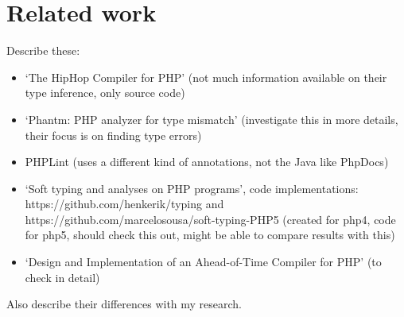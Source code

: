 \documentclass[../main.tex]{subfiles}
\begin{document}
    
    \section{Related work}\label{sec:background_related-work}
    Describe these:
    \begin{itemize}
        \item `The HipHop Compiler for PHP'\cite{Zhao:12} (not much information available on their type inference, only source code)
        \item `Phantm: PHP analyzer for type mismatch'\cite{Kne:10,Bar:10} (investigate this in more details, their focus is on finding type errors)
        \item PHPLint \footnotemark (uses a different kind of annotations, not the Java like PhpDocs)
        \item `Soft typing and analyses on PHP programs'\cite{}, code implementations: https://github.com/henkerik/typing and https://github.com/marcelosousa/soft-typing-PHP5 (created for php4, code for php5, should check this out, might be able to compare results with this)
        \item `Design and Implementation of an Ahead-of-Time Compiler for PHP'\cite{Big:10} (to check in detail)
    \end{itemize}
    Also describe their differences with my research.
    
\end{document}
